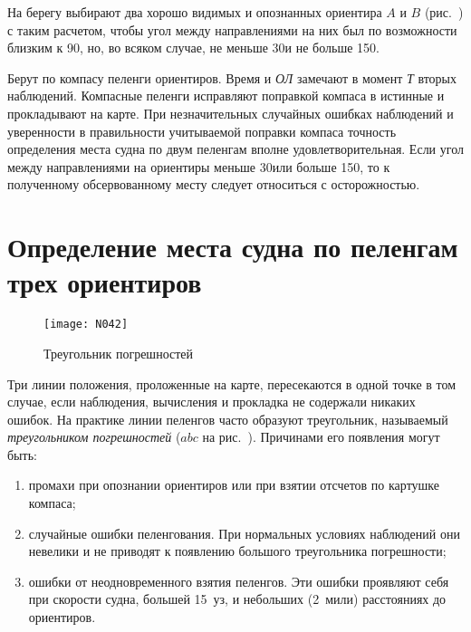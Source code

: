 На берегу выбирают два хорошо видимых и опознанных ориентира $A$ и $B$
(рис.~) с таким расчетом, чтобы угол между направлениями на
них был по возможности близким к 90\gr, но, во всяком случае, не
меньше 30\gr и не больше 150\gr.

Берут по компасу пеленги ориентиров. Время и \textit{ОЛ} замечают в
момент \textit{Т} вторых наблюдений. Компасные пеленги исправляют
поправкой компаса в истинные и прокладывают на карте. При
незначительных случайных ошибках наблюдений и уверенности в
правильности учитываемой поправки компаса точность определения места
судна по двум пеленгам вполне удовлетворительная. Если угол между
направлениями на ориентиры меньше 30\gr или больше 150\gr, то к
полученному обсервованному месту следует относиться с осторожностью.

\section{Определение места судна по пеленгам трех ориентиров}

\begin{figure}[htb]
  \centering{}
  \texttt{[image: N042]}
  \caption{Треугольник погрешностей}
  \label{fig:N42}
\end{figure}

Три линии положения, проложенные на карте, пересекаются в одной точке
в том случае, если наблюдения, вычисления и прокладка не содержали
никаких ошибок. На практике линии пеленгов часто образуют треугольник,
называемый \textit{треугольником погрешностей} 
($abc$ на рис.~). Причинами его появления могут быть:

\begin{enumerate}
\item промахи при опознании ориентиров или при взятии отсчетов по
  картушке компаса;
\item случайные ошибки пеленгования. При нормальных условиях
  наблюдений они невелики и не приводят к появлению большого
  треугольника погрешности;
\item ошибки от неодновременного взятия пеленгов. Эти ошибки проявляют
  себя при скорости судна, большей 15~уз, и небольших (2~мили) расстояниях до ориентиров.
\end{enumerate}

